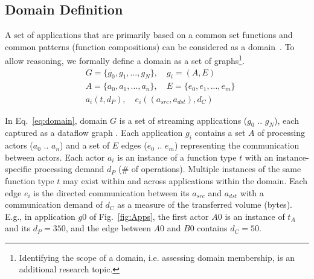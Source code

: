 \subsection{Domain Definition}
\label{sub:dmDefine}
A set of applications that are primarily based on a common set functions and common patterns (function compositions) can be considered as a domain~\cite{kang1990feature}. To allow reasoning, we formally define a domain as a set of graphs\footnote{Identifying the scope of a domain, i.e. assessing domain membership, is an additional research topic.}.
\begin{equation}
\begin{split}
\label{eq:domain}
	&G = \{g_{0}, g_{1}, ..., g_{N}\}, \quad g_{i} = (A, E)\\
	&A = \{a_{0}, a_{1}, ..., a_{n}\}, \quad E = \{e_{0}, e_{1}, ..., e_{m}\}\\
	&a_{i} (t, d_{P}), \quad e_{i} ((a_{src}, a_{dst}), d_{C})
\end{split}
\end{equation}

In Eq.~\eqref{eq:domain}, domain $G$ is a set of streaming applications ($g_{0}$ .. $g_{N}$), each captured as a dataflow graph \cite{stuijk2006sdf}. Each application $g_i$ contains a set $A$ of processing actors ($a_0$ .. $a_n$) and a set of $E$ edges ($e_0$ .. $e_m$) representing the communication between actors. Each actor $a_i$ is an instance of a function type $t$ with an instance-specific processing demand $d_{P}$ (\# of operations). Multiple instances of the same function type $t$ may exist within and across applications within the domain. Each edge $e_i$ is the directed communication between its  $a_{src}$ and  $a_{dst}$ with a communication demand of $d_{C}$ as a measure of the transferred volume (bytes). E.g., in application $g0$ of Fig.~\ref{fig:Apps}, the first actor $A0$ is an instance of $t_{A}$ and its $d_{P} = 350$, and the edge between $A0$ and $B0$ contains $d_{C} = 50$. 

